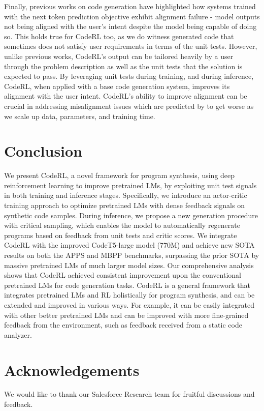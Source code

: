 \documentclass{article}
\begin{document}
Finally, previous works on code generation have highlighted how systems trained with the next token prediction objective exhibit alignment failure - model outputs not being aligned with the user's intent despite the model being capable of doing so. This holds true for CodeRL too, as we do witness generated code that sometimes does not satisfy user requirements in terms of the unit tests. However, unlike previous works, CodeRL's output can be tailored heavily by a user through the problem description as well as the unit tests that the solution is expected to pass. By leveraging unit tests during training, and during inference, CodeRL, when applied with a base code generation system, improves its alignment with the user intent. CodeRL's ability to improve alignment can be crucial in addressing misalignment issues which are predicted by \citet{chen2021evaluating} to get worse as we scale up data, parameters, and training time. 

\section{Conclusion}


We present CodeRL, a novel framework for program synthesis, using deep reinforcement learning to improve pretrained LMs, by exploiting unit test signals in both training and inference stages. Specifically, we introduce an actor-critic training approach to optimize pretrained LMs with dense feedback signals on synthetic code samples. During inference, we propose a new generation procedure with critical sampling, which enables the model to automatically regenerate programs based on feedback from unit tests and critic scores.
We integrate CodeRL with the improved CodeT5-large model (770M) and achieve new SOTA results on both the APPS and MBPP benchmarks, surpassing the prior SOTA by massive pretrained LMs of much larger model sizes. Our comprehensive analysis shows that CodeRL achieved consistent improvement upon the conventional pretrained LMs for code generation tasks. CodeRL is a general framework that integrates pretrained LMs and RL holistically for program synthesis, and can be extended and improved in various ways. For example, it can be easily integrated with other better pretrained LMs and can be improved with more fine-grained feedback from the environment, such as feedback received from a static code analyzer.

\section*{Acknowledgements}
We would like to thank our Salesforce Research team for fruitful discussions and feedback.  
\end{document}
